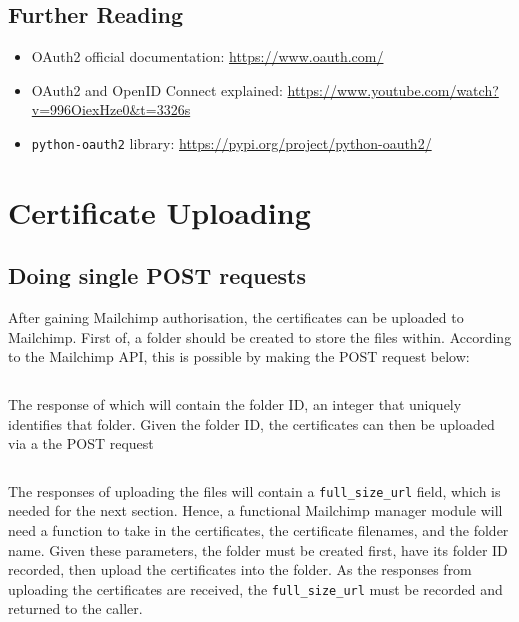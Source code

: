 \documentclass[11pt]{article}
\begin{document}
\subsection{Further Reading}

\begin{itemize}
    \item OAuth2 official documentation: \url{https://www.oauth.com/}
    \item OAuth2 and OpenID Connect explained: \url{https://www.youtube.com/watch?v=996OiexHze0&t=3326s}
    \item \texttt{python-oauth2} library: \url{https://pypi.org/project/python-oauth2/}
\end{itemize}

\newpage

\section{Certificate Uploading}

\subsection{Doing single POST requests}

After gaining Mailchimp authorisation, the certificates can be uploaded to Mailchimp. First of, a folder should be created to store the files within. According to the Mailchimp API, this is possible by making the POST request below:

\inputminted[linenos=true]{python}{mailchimp_examples/create_folder.py}

\noindent
The response of which will contain the folder ID, an integer that uniquely identifies that folder. Given the folder ID, the certificates can then be uploaded via a the POST request

\inputminted[linenos=true]{python}{mailchimp_examples/upload_file.py}

\noindent
The responses of uploading the files will contain a \texttt{full\_size\_url} field, which is needed for the next section. Hence, a functional Mailchimp manager module will need a function to take in the certificates, the certificate filenames, and the folder name. Given these parameters, the folder must be created first, have its folder ID recorded, then upload the certificates into the folder. As the responses from uploading the certificates are received, the \texttt{full\_size\_url} must be recorded and returned to the caller.
\end{document}
